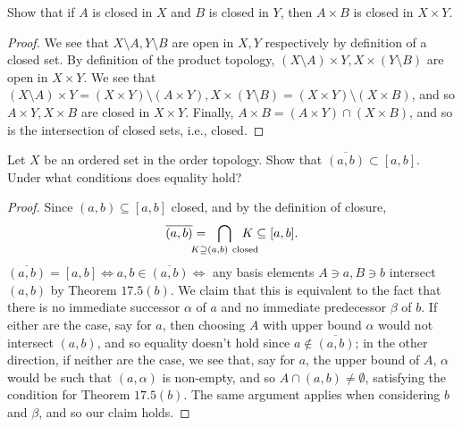 \documentclass[12pt]{article}
\theoremstyle{remark}
\begin{document}
\begin{problem}
  Show that if $A$ is closed in $X$ and $B$ is closed in $Y$, then $A \times B$ is closed in $X \times Y$.
\end{problem}
\begin{proof}
  We see that $X \setminus A, Y \setminus B$ are open in $X,Y$ respectively by definition of a closed set. By definition of the product topology, $(X \setminus A) \times Y, X \times (Y \setminus B)$ are open in $X \times Y$. We see that $(X \setminus A) \times Y = (X \times Y) \setminus (A \times Y), X \times (Y \setminus B) = (X \times Y) \setminus (X \times B)$, and so $A \times Y, X \times B$ are closed in $X \times Y$. Finally, $A \times B = (A \times Y) \cap (X \times B)$, and so is the intersection of closed sets, i.e., closed.
\end{proof}

\setcounter{subsubsection}{4}
\begin{problem}
  Let $X$ be an ordered set in the order topology. Show that $\overline{(a,b)} \subset [a,b]$. Under what conditions does equality hold?
\end{problem}
\begin{proof}
  Since $(a,b) \subseteq [a,b]$ closed, and by the definition of closure,
  \begin{equation*}
    \overline{(a,b)} =\ \ \bigcap_{\mathclap{K \supseteq (a,b)~\text{closed}}}\
    \ K \subseteq [a,b].
  \end{equation*}
  $\overline{(a,b)} = [a,b] \iff a,b \in \overline{(a,b)} \iff$ any basis
  elements $A \ni a, B \ni b$ intersect $(a,b)$ by Theorem $17.5(b)$. We claim
  that this is equivalent to the fact that there is no immediate successor
  $\alpha$ of $a$ and no immediate predecessor $\beta$ of $b$. If either are the
  case, say for $a$, then choosing $A$ with upper bound $\alpha$ would not
  intersect $(a,b)$, and so equality doesn't hold since $a \notin \overline{(a,b)}$; in the other direction, if neither are the case, we see that, say for $a$, the upper bound of $A$, $\alpha$ would be such that $(a,\alpha)$ is non-empty, and so $A \cap (a,b) \ne \emptyset$, satisfying the condition for Theorem $17.5(b)$. The same argument applies when considering $b$ and $\beta$, and so our claim holds.
\end{proof}
\end{document}
